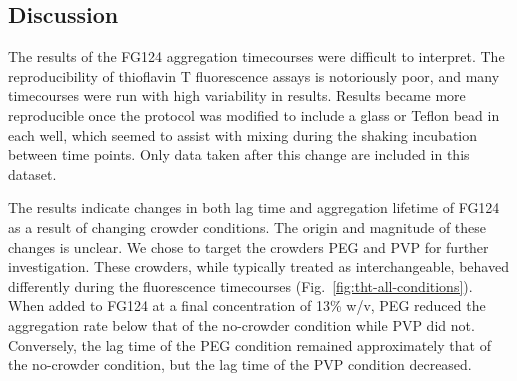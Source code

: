 


\subsection{Discussion}

The results of the FG124 aggregation timecourses were difficult to interpret.  The reproducibility of thioflavin T fluorescence assays is notoriously poor, and many timecourses were run with high variability in results.  Results became more reproducible once the protocol was modified to include a glass or Teflon bead in each well, which seemed to assist with mixing during the shaking incubation between time points.  Only data taken after this change are included in this dataset.

The results indicate changes in both lag time and aggregation lifetime of FG124 as a result of changing crowder conditions.  The origin and magnitude of these changes is unclear.  We chose to target the crowders PEG and PVP for further investigation.  These crowders, while typically treated as interchangeable, behaved differently during the fluorescence timecourses (Fig.~\ref{fig:tht-all-conditions}).  When added to FG124 at a final concentration of 13\% w/v, PEG reduced the aggregation rate below that of the no-crowder condition while PVP did not.  Conversely, the lag time of the PEG condition remained approximately that of the no-crowder condition, but the lag time of the PVP condition decreased.

